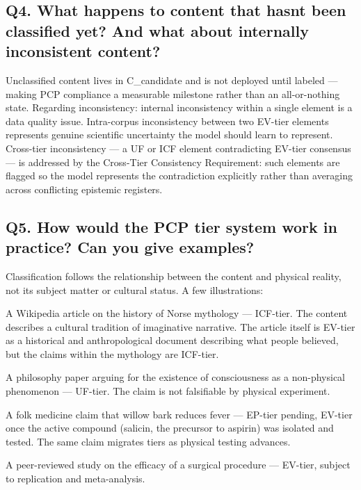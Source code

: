 \documentclass[12pt]{article}
\begin{document}
\subsection{Q4. What happens to content that hasn\textquotesingle t been
classified yet? And what about internally inconsistent
content?}\label{q4.-what-happens-to-content-that-hasnt-been-classified-yet-and-what-about-internally-inconsistent-content}

Unclassified content lives in C\_candidate and is not deployed until
labeled --- making PCP compliance a measurable milestone rather than an
all-or-nothing state. Regarding inconsistency: internal inconsistency
within a single element is a data quality issue. Intra-corpus
inconsistency between two EV-tier elements represents genuine scientific
uncertainty the model should learn to represent. Cross-tier
inconsistency --- a UF or ICF element contradicting EV-tier consensus
--- is addressed by the Cross-Tier Consistency Requirement: such
elements are flagged so the model represents the contradiction
explicitly rather than averaging across conflicting epistemic registers.

\subsection{Q5. How would the PCP tier system work in practice? Can you
give
examples?}\label{q5.-how-would-the-pcp-tier-system-work-in-practice-can-you-give-examples}

Classification follows the relationship between the content and physical
reality, not its subject matter or cultural status. A few illustrations:

A Wikipedia article on the history of Norse mythology --- ICF-tier. The
content describes a cultural tradition of imaginative narrative. The
article itself is EV-tier as a historical and anthropological document
describing what people believed, but the claims within the mythology are
ICF-tier.

A philosophy paper arguing for the existence of consciousness as a
non-physical phenomenon --- UF-tier. The claim is not falsifiable by
physical experiment.

A folk medicine claim that willow bark reduces fever --- EP-tier
pending, EV-tier once the active compound (salicin, the precursor to
aspirin) was isolated and tested. The same claim migrates tiers as
physical testing advances.

A peer-reviewed study on the efficacy of a surgical procedure ---
EV-tier, subject to replication and meta-analysis.
\end{document}
